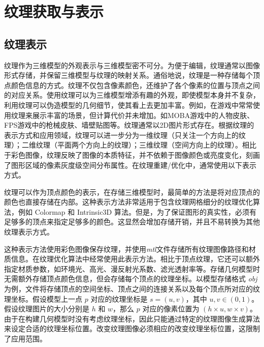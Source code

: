 %
%
\section{纹理获取与表示}
\subsection{纹理表示}
纹理作为三维模型的外观表示与三维模型密不可分。为便于编辑，纹理通常以图像形式存储，并保留三维模型与纹理的映射关系。通俗地说，纹理是一种存储每个顶点颜色信息的方式。纹理不仅包含像素颜色，还维护了各个像素的位置与顶点之间的对应关系。使用纹理可以为三维模型增添有趣的外观，即使模型本身并不复杂，利用纹理可以伪造模型的几何细节，使其看上去更加丰富。例如，在游戏中常常使用纹理来展示丰富的场景，但计算代价并未增加。如MOBA游戏中的人物皮肤、FPS游戏中的枪械皮肤、墙壁贴图等。纹理通常以2D图片形式存在。根据纹理的表示方式和应用领域，纹理可以进一步分为一维纹理（只关注一个方向上的纹理）；二维纹理（平面两个方向上的纹理）；三维纹理（空间方向上的纹理）。相比于彩色图像，纹理反映了图像的本质特征，并不依赖于图像颜色或亮度变化，刻画了图形区域的像素灰度级空间分布属性。在纹理重建/优化中，通常使用以下表示方式。\par
\vspace*{2mm} 纹理可以作为顶点颜色的表示，在存储三维模型时，最简单的方法是将对应顶点的颜色也直接存储在内部。这种表示方法非常适用于包含纹理网格细分的纹理优化算法，例如 Colormap 和 Intrinsic3D 算法。但是，为了保证图形的真实性，必须有足够多的顶点来指定足够多的颜色。这显然会增加存储开销，并且不易转换为其他纹理表示方式。\par
\vspace*{2mm}这种表示方法使用彩色图像保存纹理，并使用\emph{mtl}文件存储所有纹理图像路径和材质信息。在纹理优化算法中经常使用此表示方法。相比于顶点纹理，它还可以额外指定材质参数，如环境光、高光、漫反射光系数、滤光透射率等。存储几何模型时无需额外存储顶点颜色信息，但会存储每个顶点的纹理坐标。以模型存储格式 \emph{obj} 为例，文件将存储顶点的空间坐标、顶点之间的连接关系以及每个顶点所对应的纹理坐标。假设模型上一点 $p$ 对应的纹理坐标是 $s = (u,v)$，其中 $u,v \in (0,1)$。假设纹理图片的大小分别是 $h$ 和 $w$，那么 $p$ 对应的像素位置为 $(h \times u, w \times v)$。由于在构建几何模型时没有考虑纹理坐标，因此只能通过特定的纹理图像生成算法来设定合适的纹理坐标位置。改变纹理图像必须相应的改变纹理坐标位置，这限制了应用范围。\par

